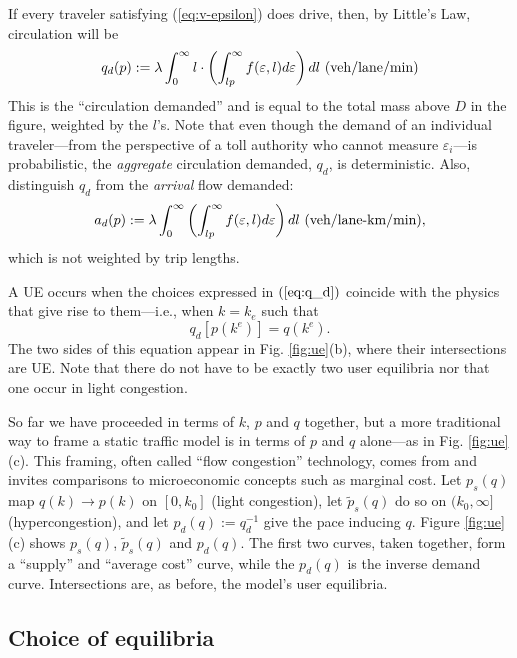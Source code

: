 \documentclass[preprint,authoryear]{elsarticle}
\newcommand{\ve}{\varepsilon}
\begin{document}
If every traveler satisfying (\ref{eq:v-epsilon}) does drive, then, by Little's Law, circulation will be
\begin{equation}\label{eq:q_d}
		q_d(p) := \lambda \int_{0}^{\infty} l \cdot \left( \int_{lp}^{\infty} f(\ve,l) d\ve \right) dl \,\, \textnormal{(veh/lane/min)}
\end{equation}
This is the ``circulation demanded'' and is equal to the total mass above $D$ in the figure, weighted by the $l$'s. Note that even though the demand of an individual traveler---from the perspective of a toll authority who cannot measure $\varepsilon_i$---is probabilistic, the \emph{aggregate} circulation demanded, $q_d$, is deterministic. Also, distinguish $q_d$ from the \emph{arrival} flow demanded:
\begin{equation}\label{eq:a_d}
	a_d(p) := \lambda \int_{0}^{\infty} \left( \int_{lp}^{\infty} f(\ve,l)d\ve \right) dl \,\, \textnormal{(veh/lane-km/min)},
\end{equation}
which is not weighted by trip lengths.

A UE occurs when the choices expressed in $(\ref{eq:q_d})$ coincide with the physics that give rise to them---i.e., when $k=k_e$ such that
\begin{equation}\label{eq:equilibrium-n}
	q_d[p(k^e)] = q(k^e).
\end{equation}
The two sides of this equation appear in Fig. \ref{fig:ue}(b), where their intersections are UE. Note that there do not have to be exactly two user equilibria nor that one occur in light congestion.

So far we have proceeded in terms of $k$, $p$ and $q$ together, but a more traditional way to frame a static traffic model is in terms of $p$ and $q$ alone---as in Fig. \ref{fig:ue}(c). This framing, often called ``flow congestion'' technology, comes from \citet{Walters1961} and invites comparisons to microeconomic concepts such as marginal cost. Let $p_s(q)$ map $q(k)\rightarrow p(k)$ on $[0,k_0]$ (light congestion), let $\tilde{p}_s(q)$ do so on $(k_0,\infty]$ (hypercongestion), and let $p_d(q):=q_d^{-1}$ give the pace inducing $q$. Figure \ref{fig:ue}(c) shows $p_s(q)$, $\tilde{p}_s(q)$ and $p_d(q)$. The first two curves, taken together, form a ``supply'' and ``average cost'' curve, while the $p_d(q)$ is the inverse demand curve. Intersections are, as before, the model's user equilibria. 

\subsection{Choice of equilibria}
\label{ssec:choice_of_equilibria}
\end{document}
